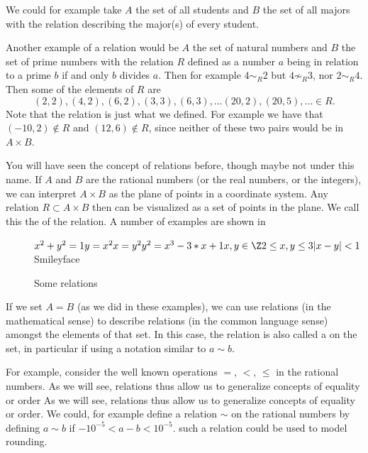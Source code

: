 We could for example take $A$ the set of all students and $B$ the set of all majors
with the relation describing the major(s) of every student.

Another example of a relation would be $A$ the set of natural numbers and $B$ the set
of prime numbers with the relation $R$ defined as a number $a$ being in relation to a
prime $b$ if and only $b$ divides $a$. Then for example $4\sim_R 2$ but
$4\not\sim_R 3$, nor $2\sim_R 4$. Then some of the elements of $R$ are
\[
(2,2), (4,2), (6,2), (3,3), (6,3), \ldots (20,2),(20,5),\ldots \in R.
\]
Note that the relation is just what we defined. For example we have that
$(-10,2)\not\in R$ and $(12,6)\not\in R$, since neither of these two pairs would be in
$A\times B$.

You will have seen the concept of relations before, though maybe not under
this name.  If $A$ and $B$ are the rational numbers (or the real numbers, or
the integers), we can interpret $A\times B$ as the plane of points in a
coordinate system. Any relation $R\subset A\times B$ then can be visualized
as a set of points in the plane. We call this the  of the
relation.  A number of examples are shown in

\begin{figure}[t]
\begin{center}
$x^2+y^2=1
y=x^2
x=y^2
y^2 = x^3 - 3*x + 1
x,y\in\Z
2\le x,y\le 3
|x-y|<1$
Smileyface
\end{center}
\caption{Some relations}
\label{figsomeRelations}
\end{figure}

If we set $A=B$ (as we did in these examples), we can use relations (in the
mathematical sense) to describe
relations (in the common language sense)  amongst the elements of that set. 
In this case, the relation is also called a  on the set, in
particular if using a notation similar to $a\sim b$.

For example, consider the well known operations $=$, $<$, $\le$ in the rational
numbers. As we will see, relations thus allow us to generalize concepts of equality or
order As we will see, relations thus allow us to generalize concepts of equality or
order. We could, for example define a relation $\sim$ on the
rational numbers by defining $a\sim b$ if $-10^{-5}<a-b<10^{-5}$. such a relation could
be used to model rounding.

